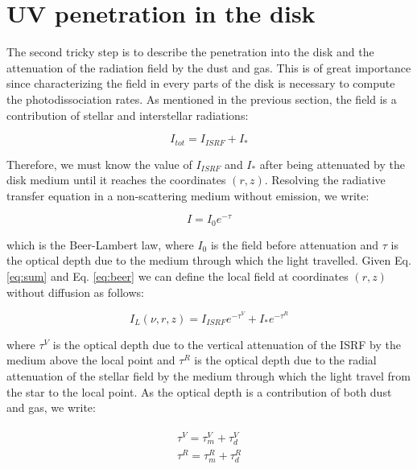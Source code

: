 \documentclass[a4paper]{article}
\begin{document}
\section{UV penetration in the disk} %
The second tricky step is to describe the penetration into the disk and the attenuation of the radiation field by the dust and gas. This is of great importance since characterizing the field in every parts of the disk is necessary to compute the photodissociation rates. As mentioned in the previous section, the field is a contribution of stellar and interstellar radiations:

\begin{equation}
\label{eq:sum}%
	I_{tot} =  I_{ISRF} + I_{*}
\end{equation}

\noindent Therefore, we must know the value of $I_{ISRF}$ and $I_{*}$ after being attenuated by the disk medium until it reaches the coordinates $(r,z)$. Resolving the radiative transfer equation in a non-scattering medium without emission, we write:

\begin{equation}
\label{eq:beer}%
	I =  I_0e^{-\tau}
\end{equation}

\noindent which is the Beer-Lambert law, where $I_0$ is the field before attenuation and $\tau$ is the optical depth due to the medium through which the light travelled. Given Eq. \ref{eq:sum} and Eq. \ref{eq:beer} we can define the local field at coordinates $(r,z)$ without diffusion as follows:


\begin{equation}
\label{eq:local}%
	I_L(\nu, r, z) =   I_{ISRF}e^{-\tau^V} + I_{*}e^{-\tau^R}
\end{equation}

\noindent where $\tau^V$ is the optical depth due to the vertical attenuation of the ISRF by the medium above the local point and $\tau^R$ is the optical depth due to the radial attenuation of the stellar field by the medium through which the light travel from the star to the local point. As the optical depth is a contribution of both dust and gas, we write:


\begin{align}
\label{eqn:tau1}
\begin{split}
 \tau^V =   \tau^V_m + \tau^V_{d}
\\
 \tau^R=   \tau^R_m + \tau^R_{d}
\end{split}
\end{align}
\end{document}
